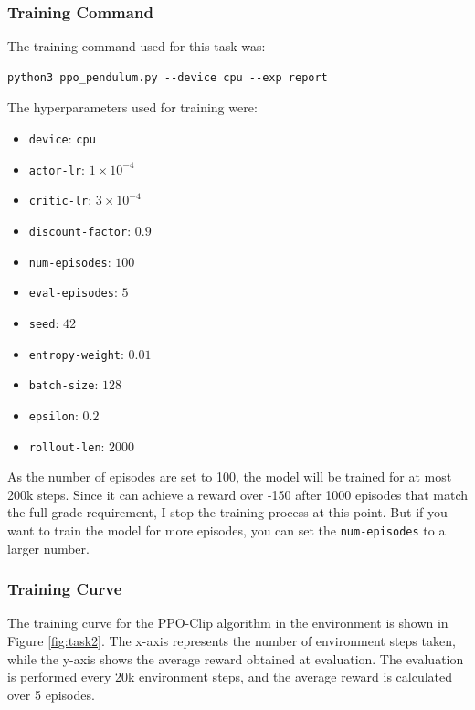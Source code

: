 \subsubsection{Training Command}

The training command used for this task was:
\begin{verbatim}
python3 ppo_pendulum.py --device cpu --exp report
\end{verbatim}

The hyperparameters used for training were:
\begin{itemize}
    \item \texttt{device}: \texttt{cpu}
    \item \texttt{actor-lr}: $1\times 10^{-4}$
    \item \texttt{critic-lr}: $3\times 10^{-4}$
    \item \texttt{discount-factor}: $0.9$
    \item \texttt{num-episodes}: $100$
    \item \texttt{eval-episodes}: $5$
    \item \texttt{seed}: $42$
    \item \texttt{entropy-weight}: $0.01$
    \item \texttt{batch-size}: $128$
    \item \texttt{epsilon}: $0.2$
    \item \texttt{rollout-len}: $2000$
\end{itemize}

As the number of episodes are set to 100, the model will be trained for at most 200k steps.
Since it can achieve a reward over -150 after 1000 episodes that match the full grade requirement, I stop the training process at this point.
But if you want to train the model for more episodes, you can set the \texttt{num-episodes} to a larger number.

\subsubsection{Training Curve}

The training curve for the PPO-Clip algorithm in the \pendulum environment is shown in Figure \ref{fig:task2}.
The x-axis represents the number of environment steps taken, while the y-axis shows the average reward obtained at evaluation.
The evaluation is performed every 20k environment steps, and the average reward is calculated over 5 episodes.

